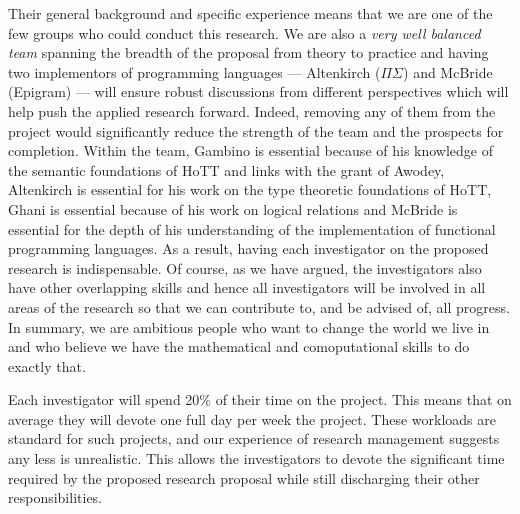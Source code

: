 \documentclass[a4paper,11pt]{article}
\begin{document}
\noindent Their general background and specific experience means that
we are one of the few groups who could conduct this research. We are
also a {\em very well balanced team} spanning the breadth of the
proposal from theory to practice and having two implementors of
programming languages --- Altenkirch ($\Pi\Sigma$) and McBride
(Epigram) --- will ensure robust discussions from different
perspectives which will help push the applied research forward.
Indeed, removing any of them from the project would significantly
reduce the strength of the team and the prospects for
completion. Within the team, Gambino is essential because of his
knowledge of the semantic foundations of HoTT and links with the grant
of Awodey, Altenkirch is essential for his work on the type theoretic
foundations of HoTT, Ghani is essential because of his work on logical
relations and McBride is essential for the depth of his understanding
of the implementation of functional programming languages.  As a
result, having each investigator on the proposed research is
indispensable. Of course, as we have argued, the investigators also
have other overlapping skills and hence all investigators will be
involved in all areas of the research so that we can contribute to,
and be advised of, all progress. In summary, we are ambitious people
who want to change the world we live in and who believe we have the
mathematical and comoputational skills to do exactly that.



\vspace{0.02in}

Each investigator will spend 20\% of their time on the project.
This means that on average they will devote one
full day per week the project. These workloads are standard for such projects, and
our experience of research management suggests any less is 
unrealistic. This allows the investigators to devote the significant
time required by the proposed research proposal while still discharging
their other responsibilities.

\vspace{0.02in}
\end{document}
